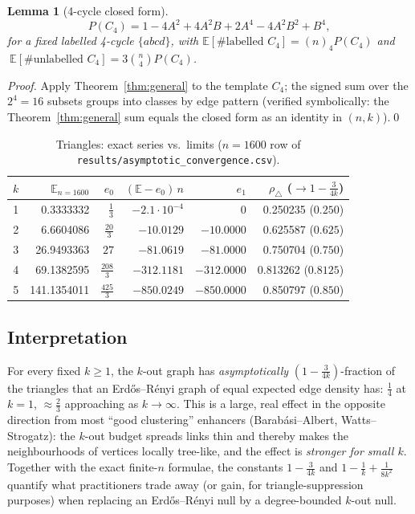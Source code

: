 \documentclass[11pt,a4paper]{article}
\newtheorem{lemma}[theorem]{Lemma}
\theoremstyle{definition}
\theoremstyle{definition}
\begin{document}
\begin{lemma}[4-cycle closed form]\label{lem:c4}
\[
P(C_4)=1-4A^{2}+4A^{2}B+2A^{4}-4A^{2}B^{2}+B^{4},
\]
for a fixed labelled 4-cycle $\{a b c d\}$, with
$\mathbb E[\#\text{labelled }C_4] = (n)_4 P(C_4)$ and
$\ \mathbb E[\#\text{unlabelled }C_4] = 3\binom{n}{4}P(C_4)$.
\end{lemma}
\begin{proof}
Apply Theorem~\ref{thm:general} to the template $C_4$; the signed sum over the
$2^{4}=16$ subsets groups into classes by edge pattern (verified symbolically: the
Theorem~\ref{thm:general} sum equals the closed form as an identity in
$(n,k)$).\qed
\end{proof}

\begin{table}[t]
\centering
\caption{Triangles: exact series vs.\ limits ($n=1600$ row of
\texttt{results/asymptotic\_convergence.csv}).}
\label{tab:asy}
\begin{tabular}{rrrrrr}
\toprule
$k$ & $\mathbb E_{n=1600}$ & $e_0$ & $(\mathbb E-e_0)\,n$ & $e_1$ & $\rho_\triangle$ ($\to 1-\tfrac3{4k}$)\\
\midrule
1 & 0.3333332 & $\tfrac13$ & $-2.1\cdot10^{-4}$ & $0$ & 0.250235 ($0.250$)\\
2 & 6.6604086 & $\tfrac{20}{3}$ & $-10.0129$ & $-10.0000$ & 0.625587 ($0.625$)\\
3 & 26.9493363 & $27$ & $-81.0619$ & $-81.0000$ & 0.750704 ($0.750$)\\
4 & 69.1382595 & $\tfrac{208}{3}$ & $-312.1181$ & $-312.0000$ & 0.813262 ($0.8125$)\\
5 & 141.1354011 & $\tfrac{425}{3}$ & $-850.0249$ & $-850.0000$ & 0.850797 ($0.850$)\\
\bottomrule
\end{tabular}
\end{table}

\subsection{Interpretation}
For every fixed $k\ge1$, the $k$-out graph has \emph{asymptotically}
$\left(1-\tfrac{3}{4k}\right)$-fraction of the triangles that an
Erd\H{o}s--R\'enyi graph of equal expected edge density has: $\tfrac14$ at $k=1$,
$\approx\tfrac23$ approaching as $k\to\infty$. This is a large, real effect in the
opposite direction from most ``good clustering'' enhancers (Barab\'asi--Albert,
Watts--Strogatz): the $k$-out budget spreads links thin and thereby makes the
neighbourhoods of vertices locally tree-like, and the effect is \emph{stronger
for small $k$}. Together with the exact finite-$n$ formulae, the constants
$1-\tfrac{3}{4k}$ and $1-\tfrac{1}{k}+\tfrac{1}{8k^{2}}$ quantify what practitioners
trade away (or gain, for triangle-suppression purposes) when replacing an
Erd\H{o}s--R\'enyi null by a degree-bounded $k$-out null.
\end{document}
